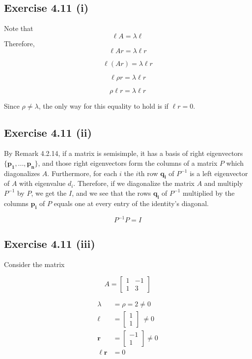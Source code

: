 \documentclass[letterpaper,12pt]{article}
\theoremstyle{definition}
\begin{document}
\subsection*{Exercise 4.11 (i)}

Note that \\
\[ \ell A = \lambda \ell \]
Therefore,
\[ \ell A r = \lambda \ell r \]

\[ \ell (A r) = \lambda \ell r \]

\[ \ell \rho r = \lambda \ell r \]

\[ \rho \ell r = \lambda \ell r \]
 
Since $\rho \neq \lambda$, the only way for this equality to hold is if $\ell r = 0$.



\subsection*{Exercise 4.11 (ii)}

By Remark 4.2.14, if a matrix is semisimple, it has a basis of right eigenvectors $\{\mathbf{p_1,...,p_n}\}$, and those right eigenvectors form the columns of a matrix $P$ which diagonalizes $A$. Furthermore, for each $i$ the $i$th row $\mathbf{q_i}$ of $P^{-1}$ is a left eigenvector of $A$ with eigenvalue $d_i$. Therefore, if we diagonalize the matrix $A$ and multiply $P^{-1}$ by $P$, we get the $I$, and we see that the rows $\mathbf{q_i}$ of $P^{-1}$ multiplied by the columns $\mathbf{p_i}$ of $P$ equals one at every entry of the identity's diagonal.

\[P^{-1}     P = I \]

\subsection*{Exercise 4.11 (iii)}

Consider the matrix 

\[A = \begin{bmatrix}
1 & -1\\
1 & 3
\end{bmatrix}\]

\begin{align*}
\lambda &= \rho = 2 \neq 0\\
\mathbf{\ell} &= \begin{bmatrix}
1\\
1
\end{bmatrix} \ \neq 0\\
\mathbf{r} &= \begin{bmatrix}
-1\\
1
\end{bmatrix} \neq 0 \\
\mathbf{\ell r} &= 0
\end{align*}
\end{document}
